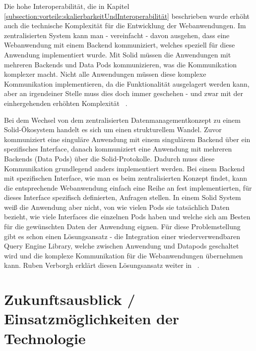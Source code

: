 \documentclass[acmtog]{acmart}
\begin{document}
Die hohe Interoperabilität, die in Kapitel \ref{subsection:vorteile:skalierbarkeitUndInteroperabilität} beschrieben wurde erhöht auch die technische Komplexität für die Entwicklung der Webanwendungen. Im zentralisierten System kann man - vereinfacht - davon ausgehen, dass eine Webanwendung mit einem Backend kommuniziert, welches speziell für diese Anwendung implementiert wurde. Mit Solid müssen die Anwendungen mit mehreren Backends und Data Pods kommunizieren, was die Kommunikation komplexer macht. Nicht alle Anwendungen müssen diese komplexe Kommunikation implementieren, da die Funktionalität ausgelagert werden kann, aber an irgendeiner Stelle muss dies doch immer geschehen - und zwar mit der einhergehenden erhöhten Komplexität ~\cite{MarcoNeumann.2021}.

Bei dem Wechsel von dem zentralisierten Datenmanagementkonzept zu einem Solid-Ökosystem handelt es sich um einen strukturellem Wandel. Zuvor kommuniziert eine singuläre Anwendung mit einem singulärem Backend über ein spezifisches Interface, danach kommuniziert eine Anwendung mit mehreren Backends (Data Pods) über die Solid-Protokolle. Dadurch muss diese Kommunikation grundlegend anders implementiert werden. Bei einem Backend mit spezifischen Interface, wie man es beim zentralisierten Konzept findet, kann die entsprechende Webanwendung einfach eine Reihe an fest implementierten, für dieses Interface spezifisch definierten, Anfragen stellen. In einem Solid System weiß die Anwendung aber nicht, von wie vielen Pods sie tatsächlich Daten bezieht, wie viele Interfaces die einzelnen Pods haben und welche sich am Besten für die gewünschten Daten der Anwendung eignen. Für diese Problemstellung gibt es schon einen Lösungsansatz - die Integration einer wiederverwendbaren Query Engine Library, welche zwischen Anwendung und Datapods geschaltet wird und die komplexe Kommunikation für die Webanwendungen übernehmen kann. Ruben Verborgh erklärt diesen Lösungsansatz weiter in  ~\cite{MarcoNeumann.2021}.

\label{section:zukunftsausblick}
\section{Zukunftsausblick / Einsatzmöglichkeiten der Technologie}
\end{document}

